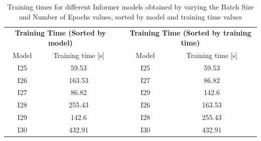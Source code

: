 \begin{table}[]
    \begin{tabular}{ccccc}
    \multicolumn{2}{c}{\textbf{Training   Time (Sorted by model)}} &  & \multicolumn{2}{c}{\textbf{Training Time (Sorted   by training time)}} \\
    Model             & Training time {[}s{]}                      &  & Model                 & Training time {[}s{]}                          \\
    I25               & \cellcolor[HTML]{63BE7B}59.53              &  & I25                   & \cellcolor[HTML]{63BE7B}59.53                  \\
    I26               & \cellcolor[HTML]{FFE784}163.53             &  & I27                   & \cellcolor[HTML]{90CB7D}86.82                  \\
    I27               & \cellcolor[HTML]{90CB7D}86.82              &  & I29                   & \cellcolor[HTML]{EDE582}142.6                  \\
    I28               & \cellcolor[HTML]{FDBC7B}255.43             &  & I26                   & \cellcolor[HTML]{FFE784}163.53                 \\
    I29               & \cellcolor[HTML]{EDE582}142.6              &  & I28                   & \cellcolor[HTML]{FDBC7B}255.43                 \\
    I30               & \cellcolor[HTML]{F8696B}432.91             &  & I30                   & \cellcolor[HTML]{F8696B}432.91                
    \end{tabular}
    \caption{Training times for different Informer models obtained by varying the Batch Size and Number of Epochs values, sorted by model and training time values}
    \label{I5_T}
    \end{table}

